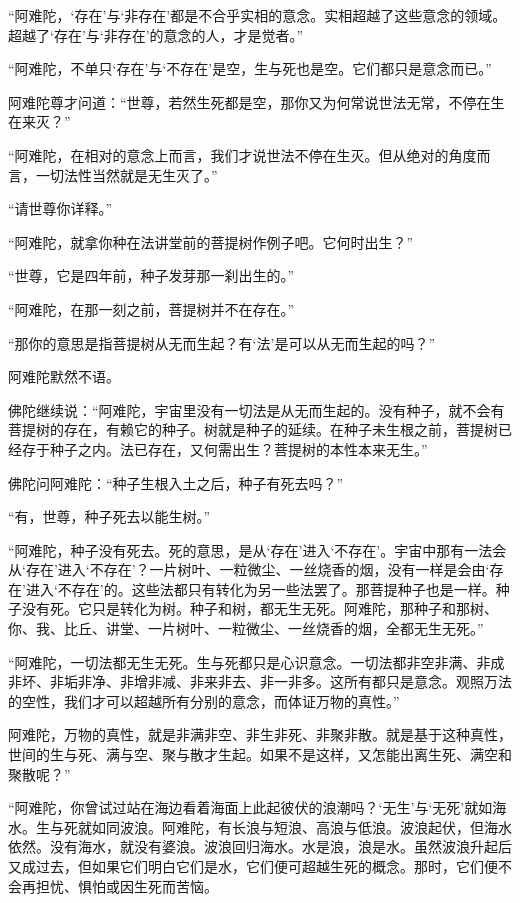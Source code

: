 \documentclass[12pt,twoside,openany]{book}
\begin{document}
“阿难陀，‘存在’与‘非存在’都是不合乎实相的意念。实相超越了这些意念的领域。超越了‘存在’与‘非存在’的意念的人，才是觉者。”

“阿难陀，不单只‘存在’与‘不存在’是空，生与死也是空。它们都只是意念而已。”

阿难陀尊才问道：“世尊，若然生死都是空，那你又为何常说世法无常，不停在生在来灭？”

“阿难陀，在相对的意念上而言，我们才说世法不停在生灭。但从绝对的角度而言，一切法性当然就是无生灭了。”

“请世尊你详释。”

“阿难陀，就拿你种在法讲堂前的菩提树作例子吧。它何时出生？”

“世尊，它是四年前，种子发芽那一刹出生的。”

“阿难陀，在那一刻之前，菩提树并不在存在。”

“那你的意思是指菩提树从无而生起？有‘法’是可以从无而生起的吗？”

阿难陀默然不语。

佛陀继续说：“阿难陀，宇宙里没有一切法是从无而生起的。没有种子，就不会有菩提树的存在，有赖它的种子。树就是种子的延续。在种子未生根之前，菩提树已经存于种子之内。法已存在，又何需出生？菩提树的本性本来无生。”

佛陀问阿难陀：“种子生根入土之后，种子有死去吗？”

“有，世尊，种子死去以能生树。”

“阿难陀，种子没有死去。死的意思，是从‘存在’进入‘不存在’。宇宙中那有一法会从‘存在’进入‘不存在’？一片树叶、一粒微尘、一丝烧香的烟，没有一样是会由‘存在’进入‘不存在’的。这些法都只有转化为另一些法罢了。那菩提种子也是一样。种子没有死。它只是转化为树。种子和树，都无生无死。阿难陀，那种子和那树、你、我、比丘、讲堂、一片树叶、一粒微尘、一丝烧香的烟，全都无生无死。”

“阿难陀，一切法都无生无死。生与死都只是心识意念。一切法都非空非满、非成非坏、非垢非净、非增非减、非来非去、非一非多。这所有都只是意念。观照万法的空性，我们才可以超越所有分别的意念，而体证万物的真性。”

阿难陀，万物的真性，就是非满非空、非生非死、非聚非散。就是基于这种真性，世间的生与死、满与空、聚与散才生起。如果不是这样，又怎能出离生死、满空和聚散呢？”

“阿难陀，你曾试过站在海边看着海面上此起彼伏的浪潮吗？‘无生’与‘无死’就如海水。生与死就如同波浪。阿难陀，有长浪与短浪、高浪与低浪。波浪起伏，但海水依然。没有海水，就没有婆浪。波浪回归海水。水是浪，浪是水。虽然波浪升起后又成过去，但如果它们明白它们是水，它们便可超越生死的概念。那时，它们便不会再担忧、惧怕或因生死而苦恼。
\end{document}
